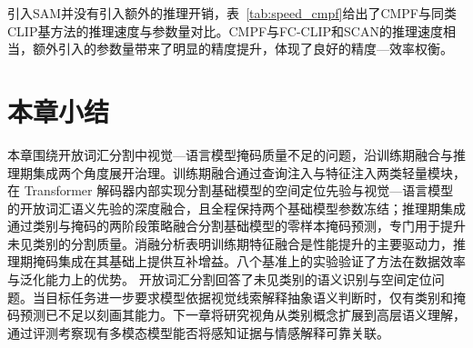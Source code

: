 



引入SAM并没有引入额外的推理开销，表~\ref{tab:speed_cmpf}给出了CMPF与同类CLIP基方法的推理速度与参数量对比。CMPF与FC-CLIP和SCAN的推理速度相当，额外引入的参数量带来了明显的精度提升，体现了良好的精度—效率权衡。


\section{本章小结}

本章围绕开放词汇分割中视觉—语言模型掩码质量不足的问题，沿训练期融合与推理期集成两个角度展开治理。训练期融合通过查询注入与特征注入两类轻量模块，在 Transformer 解码器内部实现分割基础模型的空间定位先验与视觉—语言模型的开放词汇语义先验的深度融合，且全程保持两个基础模型参数冻结；推理期集成通过类别与掩码的两阶段策略融合分割基础模型的零样本掩码预测，专门用于提升未见类别的分割质量。消融分析表明训练期特征融合是性能提升的主要驱动力，推理期掩码集成在其基础上提供互补增益。八个基准上的实验验证了方法在数据效率与泛化能力上的优势。
开放词汇分割回答了未见类别的语义识别与空间定位问题。当目标任务进一步要求模型依据视觉线索解释抽象语义判断时，仅有类别和掩码预测已不足以刻画其能力。下一章将研究视角从类别概念扩展到高层语义理解，通过评测考察现有多模态模型能否将感知证据与情感解释可靠关联。

